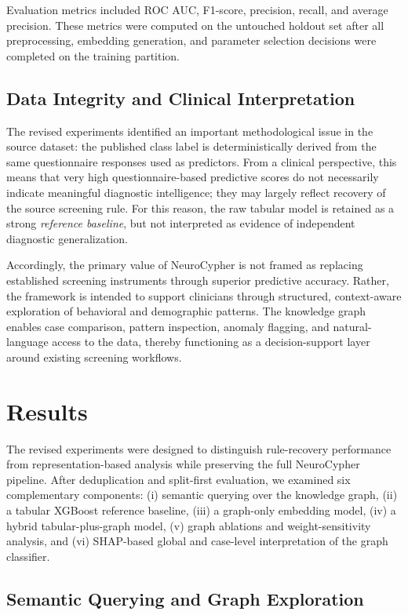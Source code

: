 Evaluation metrics included ROC AUC, F1-score, precision, recall, and average precision. These metrics were computed on the untouched holdout set after all preprocessing, embedding generation, and parameter selection decisions were completed on the training partition.

\subsection{Data Integrity and Clinical Interpretation}

The revised experiments identified an important methodological issue in the source dataset: the published class label is deterministically derived from the same questionnaire responses used as predictors. From a clinical perspective, this means that very high questionnaire-based predictive scores do not necessarily indicate meaningful diagnostic intelligence; they may largely reflect recovery of the source screening rule. For this reason, the raw tabular model is retained as a strong \textit{reference baseline}, but not interpreted as evidence of independent diagnostic generalization.

Accordingly, the primary value of NeuroCypher is not framed as replacing established screening instruments through superior predictive accuracy. Rather, the framework is intended to support clinicians through structured, context-aware exploration of behavioral and demographic patterns. The knowledge graph enables case comparison, pattern inspection, anomaly flagging, and natural-language access to the data, thereby functioning as a decision-support layer around existing screening workflows.

\section{Results}\label{sec2}

The revised experiments were designed to distinguish rule-recovery performance from representation-based analysis while preserving the full NeuroCypher pipeline. After deduplication and split-first evaluation, we examined six complementary components: (i) semantic querying over the knowledge graph, (ii) a tabular XGBoost reference baseline, (iii) a graph-only embedding model, (iv) a hybrid tabular-plus-graph model, (v) graph ablations and weight-sensitivity analysis, and (vi) SHAP-based global and case-level interpretation of the graph classifier.

\subsection{Semantic Querying and Graph Exploration}

